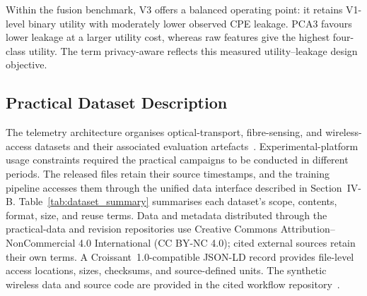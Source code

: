 \documentclass[9pt,twocolumn,twoside]{osajnl}
\begin{document}
Within the fusion benchmark, V3 offers a balanced operating point: it retains V1-level binary utility with moderately lower observed CPE leakage. PCA3 favours lower leakage at a larger utility cost, whereas raw features give the highest four-class utility. The term privacy-aware reflects this measured utility--leakage design objective.



\subsection{Practical Dataset Description}

The telemetry architecture organises optical-transport, fibre-sensing, and wireless-access datasets and their associated evaluation artefacts~\cite{Shen_dataset_2025}. Experimental-platform usage constraints required the practical campaigns to be conducted in different periods. The released files retain their source timestamps, and the training pipeline accesses them through the unified data interface described in Section~IV-B. Table~\ref{tab:dataset_summary} summarises each dataset's scope, contents, format, size, and reuse terms. Data and metadata distributed through the practical-data and revision repositories use Creative Commons Attribution--NonCommercial 4.0 International (CC BY-NC 4.0); cited external sources retain their own terms. A Croissant~1.0-compatible JSON-LD record provides file-level access locations, sizes, checksums, and source-defined units. The synthetic wireless data and source code are provided in the cited workflow repository~\cite{JOCN_revision_code_2026}.
\end{document}
